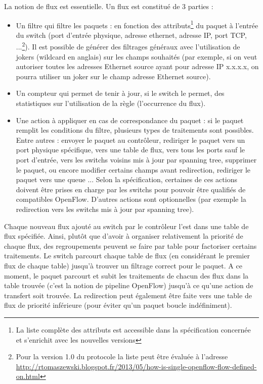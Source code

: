 La notion de flux est essentielle. Un flux est constitué de 3 parties :
\begin{itemize}

\item Un filtre qui filtre les paquets : en fonction des attributs\footnote{La liste complète des attributs est accessible dans la spécification concernée et s'enrichit avec les nouvelles versions} du paquet à l'entrée du switch (port d'entrée physique, adresse ethernet, adresse IP, port TCP, ...\footnote{Pour la version 1.0 du protocole la liste peut être évaluée à l'adresse \url{http://rtomaszewski.blogspot.fr/2013/05/how-is-single-openflow-flow-defined-on.html}}). Il est possible de générer des filtrages généraux avec l'utilisation de jokers (wildcard en anglais) sur les champs souhaités (par exemple, si on veut autoriser toutes les adresses Ethernet source ayant pour adresse IP x.x.x.x, on pourra utiliser un joker sur le champ adresse Ethernet source).

\item Un compteur qui permet de tenir à jour, si le switch le permet, des statistiques sur l'utilisation de la règle (l’occurrence du flux).

\item Une action à appliquer en cas de correspondance du paquet : si le paquet remplit les conditions du filtre, plusieurs types de traitements sont possibles. Entre autres : envoyer le paquet au contrôleur, rediriger le paquet vers un port physique spécifique, vers une table de flux, vers tous les ports sauf le port d'entrée, vers les switchs voisins mis à jour par spanning tree, supprimer le paquet, ou encore modifier certains champs avant redirection, rediriger le paquet vers une queue ... Selon la spécification, certaines de ces actions doivent être prises en charge par les switchs pour pouvoir être qualifiés de compatibles OpenFlow. D'autres actions sont optionnelles (par exemple la redirection vers les switchs mis à jour par spanning tree).

\end{itemize}

Chaque nouveau flux ajouté au switch par le contrôleur l'est dans une table de flux spécifiée. Ainsi, plutôt que d'avoir à organiser relativement la priorité de chaque flux, des regroupements peuvent se faire par table pour factoriser certains traitements. Le switch parcourt chaque table de flux (en considérant le premier flux de chaque table) jusqu'à trouver un filtrage correct pour le paquet. A ce moment, le paquet parcourt et subit les traitements de chacun des flux dans la table trouvée (c'est la notion de pipeline OpenFlow) jusqu'à ce qu'une action de transfert soit trouvée. La redirection peut également être faite vers une table de flux de priorité inférieure (pour éviter qu'un paquet boucle indéfiniment).

